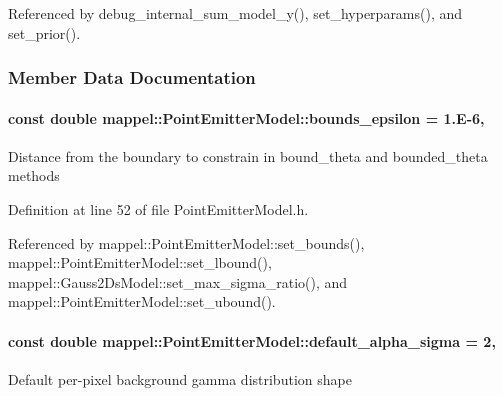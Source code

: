 Referenced by debug\+\_\+internal\+\_\+sum\+\_\+model\+\_\+y(), set\+\_\+hyperparams(), and set\+\_\+prior().



\subsubsection{Member Data Documentation}
\paragraph[{\texorpdfstring{bounds\+\_\+epsilon}{bounds_epsilon}}]{\setlength{\rightskip}{0pt plus 5cm}const double mappel\+::\+Point\+Emitter\+Model\+::bounds\+\_\+epsilon = 1.\+E-\/6\hspace{0.3cm}{\ttfamily [static]}, {\ttfamily [inherited]}}\hypertarget{classmappel_1_1PointEmitterModel_ac987a119137b85a27704b1c40e3fab8c}{}\label{classmappel_1_1PointEmitterModel_ac987a119137b85a27704b1c40e3fab8c}
Distance from the boundary to constrain in bound\+\_\+theta and bounded\+\_\+theta methods 

Definition at line 52 of file Point\+Emitter\+Model.\+h.



Referenced by mappel\+::\+Point\+Emitter\+Model\+::set\+\_\+bounds(), mappel\+::\+Point\+Emitter\+Model\+::set\+\_\+lbound(), mappel\+::\+Gauss2\+Ds\+Model\+::set\+\_\+max\+\_\+sigma\+\_\+ratio(), and mappel\+::\+Point\+Emitter\+Model\+::set\+\_\+ubound().

\paragraph[{\texorpdfstring{default\+\_\+alpha\+\_\+sigma}{default_alpha_sigma}}]{\setlength{\rightskip}{0pt plus 5cm}const double mappel\+::\+Point\+Emitter\+Model\+::default\+\_\+alpha\+\_\+sigma = 2\hspace{0.3cm}{\ttfamily [static]}, {\ttfamily [inherited]}}\hypertarget{classmappel_1_1PointEmitterModel_a0d9f2c5438940f329e75708987e8b343}{}\label{classmappel_1_1PointEmitterModel_a0d9f2c5438940f329e75708987e8b343}
Default per-\/pixel background gamma distribution shape 

